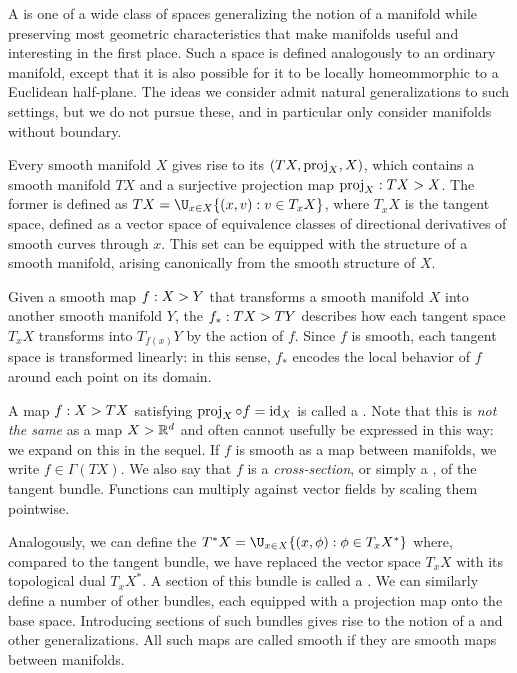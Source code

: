 \documentclass[11pt]{book}
\begin{document}
A  is one of a wide class of spaces generalizing the notion of a manifold while preserving most geometric characteristics that make manifolds useful and interesting in the first place.
Such a space is defined analogously to an ordinary manifold, except that it is also possible for it to be locally homeommorphic to a Euclidean half-plane.
The ideas we consider admit natural generalizations to such settings, but we do not pursue these, and in particular only consider manifolds without boundary.

Every smooth manifold $X$ gives rise to its  $(TX,\operatorname{proj}_X,X)$, which contains a smooth manifold $TX$ and a surjective projection map $\operatorname{proj}_X : TX \-> X$.
The former is defined as $TX = \U_{x\in X} \{(x,v) : v \in T_x X\}$, where $T_x X$ is the tangent space, defined as a vector space of equivalence classes of directional derivatives of smooth curves through $x$.
This set can be equipped with the structure of a smooth manifold, arising canonically from the smooth structure of $X$.

Given a smooth map $f: X \-> Y$ that transforms a smooth manifold $X$ into another smooth manifold $Y$, the  $f_* : TX \-> TY$ describes how each tangent space $T_x X$ transforms into $T_{f(x)} Y$ by the action of $f$.
Since $f$ is smooth, each tangent space is transformed linearly: in this sense, $f_*$ encodes the local behavior of $f$ around each point on its domain.

A map $f : X \-> TX$ satisfying $\operatorname{proj}_X \circ f = \operatorname{id}_X$ is called a .
Note that this is \emph{not the same} as a map $X \-> \mathbb{R}^d$ and often cannot usefully be expressed in this way: we expand on this in the sequel.
If $f$ is smooth as a map between manifolds, we write $f \in \Gamma(TX)$.
We also say that $f$ is a \emph{cross-section}, or simply a , of the tangent bundle.
Functions can multiply against vector fields by scaling them pointwise.

Analogously, we can define the  $T^* X = \U_{x\in X} \{(x,\phi) : \phi \in T_x X^*\}$ where, compared to the tangent bundle, we have replaced the vector space $T_x X$ with its topological dual $T_x X^*$.
A section of this bundle is called a .
We can similarly define a number of other bundles, each equipped with a projection map onto the base space.
Introducing sections of such bundles gives rise to the notion of a  and other generalizations.
All such maps are called smooth if they are smooth maps between manifolds.
\end{document}

